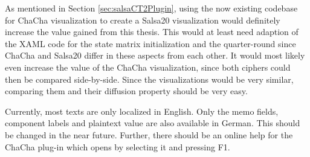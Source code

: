 \begin{description}[style=nextline]
\item[Salsa20 visualization]

As mentioned in Section \ref{sec:salsaCT2Plugin}, using the now existing codebase for ChaCha visualization to create a Salsa20 visualization would definitely increase the value gained from this thesis. This would at least need adaption of the XAML code for the state matrix initialization and the quarter-round since ChaCha and Salsa20 differ in these aspects from each other. It would most likely even increase the value of the ChaCha visualization, since both ciphers could then be compared side-by-side. Since the visualizations would be very similar, comparing them and their diffusion property should be very easy.

\item[Localization and online help]

Currently, most texts are only localized in English. Only the memo fields, component labels and plaintext value are also available in German. This should be changed in the near future. Further, there should be an online help for the ChaCha plug-in which opens by selecting it and pressing F1.

\end{description}

